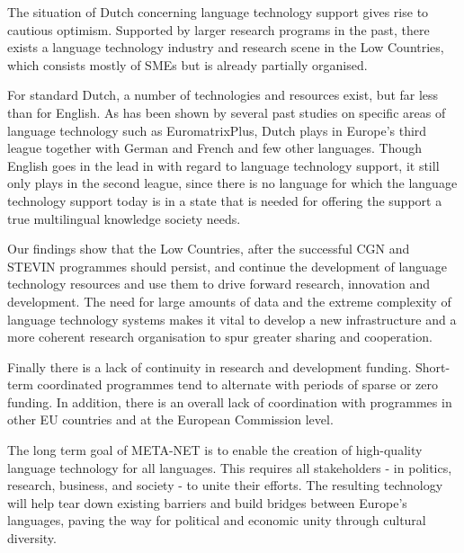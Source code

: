 \documentclass[]{../../metanetpaper}
\begin{document}
\begin{multicols}{2}
   The situation of Dutch concerning language technology support gives rise to cautious optimism. Supported by larger research programs in the past, there exists a language technology industry and research scene in the Low Countries, which consists mostly of SMEs but is already partially organised.

    For standard Dutch, a number of technologies and resources exist, but far less than for English. As has been shown by several past studies on specific areas of language technology such as EuromatrixPlus, Dutch plays in Europe's third league together with German and French and few other languages. Though English goes in the lead in with regard to language technology support, it still only plays in the second league, since there is no language for which the language technology support today is in a state that is needed for offering the support a true multilingual knowledge society needs.

    Our findings show that the Low Countries, after the successful CGN and STEVIN programmes should persist, and continue the development of language technology resources and use them to drive forward research, innovation and development. The need for large amounts of data and the extreme complexity of language technology systems makes it vital to develop a new infrastructure and a more coherent research organisation to spur greater sharing and cooperation.


Finally there is a lack of continuity in research and development funding. Short-term coordinated programmes tend to alternate with periods of sparse or zero funding. In addition, there is an overall lack of coordination with programmes in other EU countries and at the European Commission level.

The long term goal of META-NET is to enable the creation of high-quality language technology for all languages. This requires all stakeholders - in politics, research, business, and society - to unite their efforts. The resulting technology will help tear down existing barriers and build bridges between Europe’s languages, paving the way for political and economic unity through cultural diversity.
\end{multicols}

\clearpage
\end{document}
